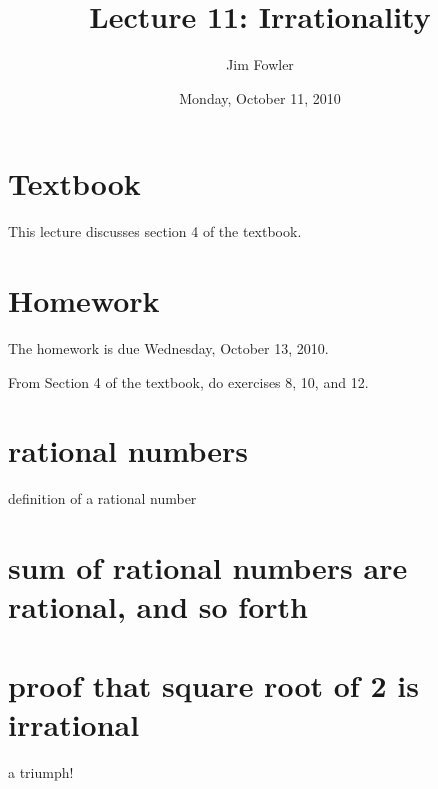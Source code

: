 \documentclass[12pt]{handout}
\title{Lecture 11: Irrationality}
\author{Jim Fowler}
\date{Monday, October 11, 2010}
\begin{document}
\maketitle

\section*{Textbook}

This lecture discusses section 4 of the textbook.

\section*{Homework} 

The homework is due Wednesday, October 13, 2010.

From Section 4 of the textbook, do exercises 8, 10, and 12.

\section*{rational numbers}

definition of a rational number

\section*{sum of rational numbers are rational, and so forth}

\section*{proof that square root of 2 is irrational}

a triumph!
\end{document}
